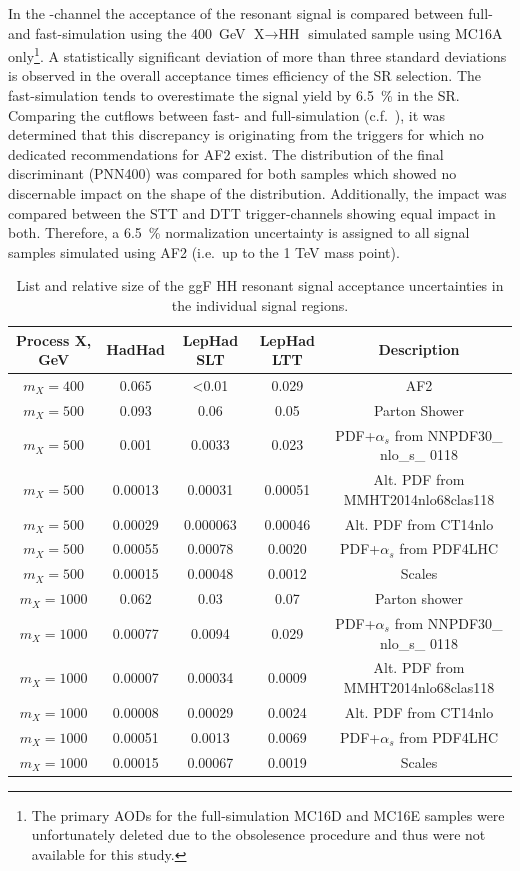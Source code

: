 In the \hadhad-channel the acceptance of the resonant signal is
compared between full- and fast-simulation using the \SI{400}{\GeV}
$\text{X} \to \text{HH}$ simulated sample using MC16A
only\footnote{The primary AODs for the full-simulation MC16D and MC16E
  samples were unfortunately deleted due to the obsolesence procedure
  and thus were not available for this study.}. A statistically
significant deviation of more than three standard deviations is
observed in the overall acceptance times efficiency of the \hadhad SR selection. The
fast-simulation tends to overestimate the signal yield by 6.5~\% in
the \hadhad SR. Comparing the cutflows between fast- and
full-simulation (c.f.\ ), it
was determined that this discrepancy is originating from the \tauhad
triggers for which no dedicated recommendations for AF2 exist. The
distribution of the final discriminant (PNN400) was compared for both
samples which showed no discernable impact on the shape of the
distribution. Additionally, the impact was compared between the STT
and DTT trigger-channels showing equal impact in both. Therefore, a
6.5~\% normalization uncertainty is assigned to all signal samples
simulated using AF2 (i.e.\ up to the 1 TeV mass
point). 

\begin{table}
\centering
\small
\begin{tabular}{|c|c|c|c|c|}
\hline
Process X, GeV& HadHad & LepHad SLT  & LepHad LTT & Description\\
\hline
$m_{X}= 400$ & 0.065 &  <0.01 & 0.029 & AF2\\
$m_{X}= 500$ & 0.093 &  0.06 & 0.05 & Parton Shower\\
$m_{X}= 500$ & 0.001 &  0.0033 & 0.023 & PDF+$\alpha_s$ from NNPDF30\_ nlo\_s\_ 0118\\
$m_{X}= 500$ & 0.00013 &   0.00031 &  0.00051 & Alt. PDF from MMHT2014nlo68clas118\\ %
$m_{X}= 500$ & 0.00029 &  0.000063 &  0.00046 & Alt. PDF from CT14nlo\\ 
$m_{X}= 500$ & 0.00055 &  0.00078 &  0.0020 & PDF+$\alpha_s$ from PDF4LHC\\ 
$m_{X}= 500$ & 0.00015 &  0.00048 &  0.0012 & Scales \\
$m_{X}= 1000$ & 0.062 &  0.03 &  0.07 & Parton shower\\
$m_{X}= 1000$ & 0.00077 &  0.0094 &  0.029 & PDF+$\alpha_s$ from NNPDF30\_ nlo\_s\_ 0118\\
$m_{X}= 1000$ & 0.00007 &  0.00034 &   0.0009 & Alt. PDF from MMHT2014nlo68clas118\\ %
$m_{X}= 1000$ & 0.00008 &   0.00029 &  0.0024 & Alt. PDF from CT14nlo\\ 
$m_{X}= 1000$ & 0.00051 &   0.0013 &  0.0069 & PDF+$\alpha_s$ from PDF4LHC\\ 
$m_{X}= 1000$ & 0.00015 &   0.00067 &  0.0019  & Scales \\
\hline
\end{tabular}
\caption{List and relative size of the ggF HH resonant signal acceptance uncertainties in the individual signal regions.}
\label{sec:systs:tab:systematics_HHSignal_AcceptanceNumbers}
\end{table}


